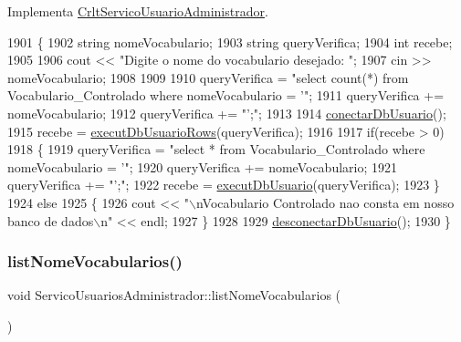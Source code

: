 Implementa \mbox{\hyperlink{class_crlt_servico_usuario_administrador_af6b9c9eb9a047c0677de25b07062bff5}{Crlt\+Servico\+Usuario\+Administrador}}.


\begin{DoxyCode}
1901 \{
1902   \textcolor{keywordtype}{string} nomeVocabulario;
1903   \textcolor{keywordtype}{string} queryVerifica;
1904   \textcolor{keywordtype}{int} recebe;
1905 
1906   cout << \textcolor{stringliteral}{"Digite o nome do vocabulario desejado: "};
1907   cin >> nomeVocabulario;
1908 
1909 
1910   queryVerifica = \textcolor{stringliteral}{"select count(*) from Vocabulario\_Controlado where nomeVocabulario = '"};
1911   queryVerifica += nomeVocabulario;
1912   queryVerifica += \textcolor{stringliteral}{"';"};
1913 
1914   \mbox{\hyperlink{comando_sql_8cpp_a4f89ddcbc4cf8f2587d89f72f8c7900d}{conectarDbUsuario}}();
1915   recebe = \mbox{\hyperlink{comando_sql_8cpp_af54952694f2fa7d76f969fb74b853cb9}{executDbUsuarioRows}}(queryVerifica);
1916 
1917   \textcolor{keywordflow}{if}(recebe > 0)
1918       \{
1919         queryVerifica = \textcolor{stringliteral}{"select * from Vocabulario\_Controlado where nomeVocabulario = '"};
1920         queryVerifica += nomeVocabulario;
1921         queryVerifica += \textcolor{stringliteral}{"';"};
1922         recebe = \mbox{\hyperlink{comando_sql_8cpp_a748197580e7f9acdbf48c78de1f7924b}{executDbUsuario}}(queryVerifica);
1923       \}
1924   \textcolor{keywordflow}{else}
1925       \{
1926         cout << \textcolor{stringliteral}{"\(\backslash\)nVocabulario Controlado nao consta em nosso banco de dados\(\backslash\)n"} << endl;
1927       \}
1928 
1929       \mbox{\hyperlink{comando_sql_8cpp_a969be9911913568e30d4ae8963338bc3}{desconectarDbUsuario}}();
1930 \}
\end{DoxyCode}
\mbox{\label{class_servico_usuarios_administrador_a72b7761474e413704531b3234744d0e0}} 
\subsubsection{\texorpdfstring{list\+Nome\+Vocabularios()}{listNomeVocabularios()}}
{\footnotesize\ttfamily void Servico\+Usuarios\+Administrador\+::list\+Nome\+Vocabularios (\begin{DoxyParamCaption}{ }\end{DoxyParamCaption})\hspace{0.3cm}{\ttfamily [virtual]}}



